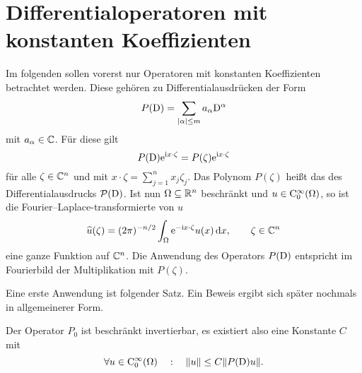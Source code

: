 \section{Differentialoperatoren mit konstanten Koeffizienten}
Im folgenden sollen vorerst nur Operatoren mit konstanten Koeffizienten betrachtet werden. Diese gehören zu Differentialausdrücken der Form
\begin{equation}
     P(\mathrm D) = \sum_{|\alpha|\le m} a_\alpha \mathrm D^\alpha
\end{equation}
mit $a_\alpha\in\mathbb C$. Für diese gilt 
\begin{equation}
     P(\mathrm D) \mathrm e^{\mathrm i x\cdot\zeta}  =  P(\zeta) \mathrm e^{\mathrm i x\cdot\zeta}
\end{equation}
für alle $\zeta\in\mathbb C^n$ und mit $x\cdot\zeta = \sum_{j=1}^n x_j\zeta_j$. Das Polynom $ P(\zeta)$ heißt das  des Differentialausdrucks $\mathcal P(\mathrm D)$. Ist nun $\Omega\subseteq\mathbb R^n$ beschränkt und $u\in\mathrm C_0^\infty(\Omega)$, so ist die Fourier--Laplace-transformierte von $u$
\begin{equation}
    \widehat u (\zeta) = (2\pi)^{-n/2} \int_\Omega \mathrm e^{-\mathrm i x\cdot\zeta } u(x) \,\mathrm d x,\qquad \zeta\in\mathbb C^n
\end{equation}
eine ganze Funktion auf $\mathbb C^n$. Die Anwendung des Operators $ P(\mathrm D)$ entspricht im Fourierbild der Multiplikation mit $ P(\zeta)$. 

Eine erste Anwendung ist folgender Satz. Ein Beweis ergibt sich später nochmals in allgemeinerer Form.

\begin{thm}\label{thm:1:1.8}
Der Operator $P_0$ ist beschränkt invertierbar, es existiert also eine Konstante $C$ mit
\begin{equation}
   \forall u\in\mathrm C_0^\infty(\Omega)\quad:\quad \|u\|\le C\| P(\mathrm D) u\|.
\end{equation}
\end{thm}

